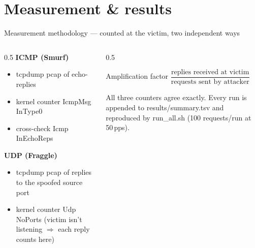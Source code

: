 \documentclass[aspectratio=169,10pt]{beamer}
\newcommand{\code}[1]{{\ttfamily #1}}
\begin{document}
\section{Measurement \& results}
\begin{frame}{Measurement methodology — counted at the victim, two independent ways}
  \begin{columns}[T]
    \begin{column}{0.5\textwidth}
      \textbf{ICMP (Smurf)}
      \begin{itemize}\small
        \item \code{tcpdump} pcap of echo-replies
        \item kernel counter \code{IcmpMsg InType0}
        \item cross-check \code{Icmp InEchoReps}
      \end{itemize}
      \textbf{UDP (Fraggle)}
      \begin{itemize}\small
        \item \code{tcpdump} pcap of replies to the spoofed source port
        \item kernel counter \code{Udp NoPorts}
              \footnotesize (victim isn't listening $\Rightarrow$ each reply counts here)
      \end{itemize}
    \end{column}
    \begin{column}{0.5\textwidth}
      \begin{block}{Amplification factor}
        \centering\small
        $\dfrac{\text{replies received at victim}}{\text{requests sent by attacker}}$
      \end{block}
      \footnotesize
      All three counters agree exactly. Every run is appended to
      \code{results/summary.tsv} and reproduced by \code{run\_all.sh}
      (100 requests/run at 50\,pps).
    \end{column}
  \end{columns}
\end{frame}
\end{document}
